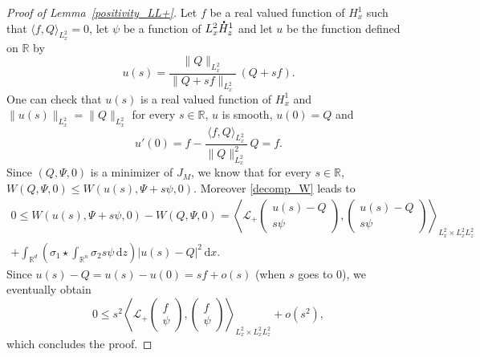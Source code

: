 \documentclass[JEP,XML,SOM,NoEqCountersInSection,NoFloatCountersInSection,Unicode,published]{cedram}
\theoremstyle{definition}
\newcommand*{\overbigdot}[1]{%
\accentset{\mbox{\large\bfseries .}}{#1}}
\newenvironment{ProofOf}[1]{\begin{proof}[Proof of #1]}{\end{proof}}
\newcommand{\R}{\mathbb{R}}
\newcommand{\ud}{\, {\mathrm{d}}}
\begin{document}
\begin{ProofOf}{Lemma~\ref{positivity_LL+}}
Let $f$ be a real valued function of $H_{x}^{1}$ such that $\langle f,Q\rangle_{L_{x}^{2}}=0$, let $\psi$ be a function of $L_{x}^{2}\overbigdot{H}_{z}^{1}$ and let $u$ be the function defined on $\R$ by
\[
u(s)=\frac{\|Q\|_{L_{x}^{2}}}{\|Q+sf\|_{L_{x}^{2}}}\,(Q+sf).
\]
One can check that $u(s)$ is a real valued function of $H_{x}^{1}$ and $\|u(s)\|_{L_{x}^{2}}=\|Q\|_{L_{x}^{2}}$ for every $s\in\R$, $u$ is smooth, $u(0)=Q$ and
\[
u'(0)=f-\frac{\langle f,Q\rangle_{L_{x}^{2}}}{\|Q\|_{L_{x}^{2}}^{2}}\,Q=f.
\]
Since $(Q,\Psi,0)$ is a minimizer of $J_{M}$, we know that for every $s\in\R$, $W(Q,\Psi,0)\leq W(u(s),\Psi+s\psi,0)$. Moreover \eqref{decomp_W} leads to
\bgroup
{}
\begin{multline*}
0\leq W(u(s),\Psi+s\psi,0)-W(Q,\Psi,0)=\left\langle\mathcal{L}_{+}\begin{pmatrix} u(s)-Q\\s\psi \end{pmatrix},\begin{pmatrix} u(s)-Q\\s\psi \end{pmatrix}\right\rangle_{L_{x}^{2}\times L_{x}^{2}L_{z}^{2}}\\
+\int_{\R^{d}}\left(\sigma_{1}\star\int_{\R^{n}}\sigma_{2}s\psi\ud z\right)|u(s)-Q|^{2}\ud x.
\end{multline*}
\egroup
Since $u(s)-Q=u(s)-u(0)=sf+o(s)$ (when $s$ goes to $0$), we eventually obtain
\[
0\leq s^{2}\left\langle\mathcal{L}_{+}\begin{pmatrix} f\\\psi \end{pmatrix},\begin{pmatrix} f\\\psi \end{pmatrix}\right\rangle_{L_{x}^{2}\times L_{x}^{2}L_{z}^{2}}+o(s^{2}),
\]
which concludes the proof.
\end{ProofOf}
\end{document}
